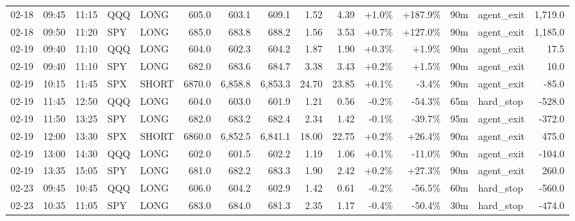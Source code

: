 \documentclass[11pt,a4paper,twoside]{article}
\begin{document}
\begin{landscape}
\begin{center}
\begin{longtable}{>{\color{txtmain}}l l l l l r r r r r r r r >{\color{txtmain}}l r}
02-18 & 09:45 & 11:15 & QQQ & LONG & 605.0 & 603.1 & 609.1 & 1.52 & 4.39 & \textcolor{wingreen}{+1.0\%} & \textcolor{wingreen}{+187.9\%} & 90m & agent\_exit & \textcolor{wingreen}{1,719.0} \\
02-18 & 09:50 & 11:20 & SPY & LONG & 685.0 & 683.8 & 688.2 & 1.56 & 3.53 & \textcolor{wingreen}{+0.7\%} & \textcolor{wingreen}{+127.0\%} & 90m & agent\_exit & \textcolor{wingreen}{1,185.0} \\
02-19 & 09:40 & 11:10 & QQQ & LONG & 604.0 & 602.3 & 604.2 & 1.87 & 1.90 & \textcolor{wingreen}{+0.3\%} & \textcolor{wingreen}{+1.9\%} & 90m & agent\_exit & \textcolor{wingreen}{17.5} \\
02-19 & 09:40 & 11:10 & SPY & LONG & 682.0 & 683.6 & 684.7 & 3.38 & 3.43 & \textcolor{wingreen}{+0.2\%} & \textcolor{wingreen}{+1.5\%} & 90m & agent\_exit & \textcolor{wingreen}{10.0} \\
02-19 & 10:15 & 11:45 & SPX & SHORT & 6870.0 & 6,858.8 & 6,853.3 & 24.70 & 23.85 & \textcolor{wingreen}{+0.1\%} & \textcolor{lossred}{-3.4\%} & 90m & agent\_exit & \textcolor{lossred}{-85.0} \\
02-19 & 11:45 & 12:50 & QQQ & LONG & 604.0 & 603.0 & 601.9 & 1.21 & 0.56 & \textcolor{lossred}{-0.2\%} & \textcolor{lossred}{-54.3\%} & 65m & hard\_stop & \textcolor{lossred}{-528.0} \\
02-19 & 11:50 & 13:25 & SPY & LONG & 682.0 & 683.2 & 682.4 & 2.34 & 1.42 & \textcolor{lossred}{-0.1\%} & \textcolor{lossred}{-39.7\%} & 95m & agent\_exit & \textcolor{lossred}{-372.0} \\
02-19 & 12:00 & 13:30 & SPX & SHORT & 6860.0 & 6,852.5 & 6,841.1 & 18.00 & 22.75 & \textcolor{wingreen}{+0.2\%} & \textcolor{wingreen}{+26.4\%} & 90m & agent\_exit & \textcolor{wingreen}{475.0} \\
02-19 & 13:00 & 14:30 & QQQ & LONG & 602.0 & 601.5 & 602.2 & 1.19 & 1.06 & \textcolor{wingreen}{+0.1\%} & \textcolor{lossred}{-11.0\%} & 90m & agent\_exit & \textcolor{lossred}{-104.0} \\
02-19 & 13:35 & 15:05 & SPY & LONG & 681.0 & 682.2 & 683.3 & 1.90 & 2.42 & \textcolor{wingreen}{+0.2\%} & \textcolor{wingreen}{+27.3\%} & 90m & agent\_exit & \textcolor{wingreen}{260.0} \\
02-23 & 09:45 & 10:45 & QQQ & LONG & 606.0 & 604.2 & 602.9 & 1.42 & 0.61 & \textcolor{lossred}{-0.2\%} & \textcolor{lossred}{-56.5\%} & 60m & hard\_stop & \textcolor{lossred}{-560.0} \\
02-23 & 10:35 & 11:05 & SPY & LONG & 683.0 & 684.0 & 681.3 & 2.35 & 1.17 & \textcolor{lossred}{-0.4\%} & \textcolor{lossred}{-50.4\%} & 30m & hard\_stop & \textcolor{lossred}{-474.0} \\

\end{longtable}
\end{center}
\end{landscape}
\end{document}
